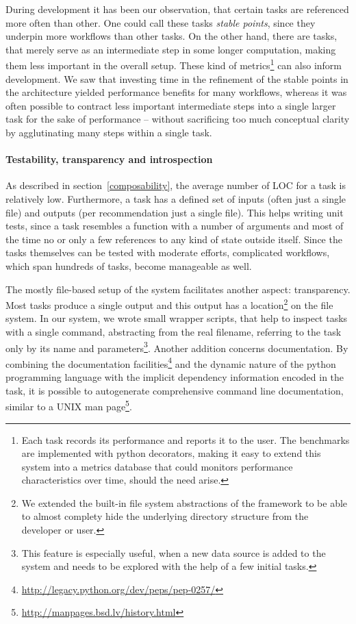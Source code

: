 \documentclass[english]{lni}
\begin{document}
During development it has been our observation, that certain tasks are referenced more often
than other. One could call these tasks \emph{stable points}, since they underpin
more workflows than other tasks. On the other hand, there are tasks, that merely
serve as an intermediate step in some longer computation, making them
less important in the overall setup. These kind of metrics\footnote{Each
task records its performance and reports it to the user. The benchmarks
are implemented with python decorators, making it easy to extend this system
into a metrics database that could monitors performance characteristics
over time, should the need arise.}
can also inform development. We saw that investing time in the refinement of the stable points in the
architecture yielded performance benefits for many workflows, whereas it was
often possible to contract less important intermediate steps into a single larger
task for the sake of performance -- without sacrificing too much conceptual
clarity by agglutinating many steps within a single task.

\paragraph{Testability, transparency and introspection}

As described in section~\ref{composability}, the average number of LOC for a
task is relatively low. Furthermore, a task has a defined set of inputs (often
just a single file) and outputs (per recommendation just a single file).
This helps writing unit tests, since a task resembles a function with
a number of arguments and most of the time no or only a few references to
any kind of state outside itself. Since the tasks themselves can be tested
with moderate efforts, complicated workflows, which span hundreds of tasks,
become manageable as well.

The mostly file-based setup of the system facilitates another aspect: transparency.
Most tasks produce a single output and this output has a location\footnote{We extended the built-in file system abstractions of the framework to be able to almost complety hide the underlying directory structure from the developer or user.} on the file system.
In our system, we wrote small wrapper scripts, that help to inspect tasks with a single command, abstracting
from the real filename, referring to the task only by its name and parameters\footnote{This feature is especially useful, when a new data source is added to the system
and needs to be explored with the help of a few initial tasks.}. Another
addition concerns documentation. By combining the documentation facilities\footnote{\url{http://legacy.python.org/dev/peps/pep-0257/}}
and the dynamic nature of the python programming language with the implicit
dependency information encoded in the task, it is possible to autogenerate
comprehensive command line documentation, similar to a UNIX man page\footnote{\url{http://manpages.bsd.lv/history.html}}.
\end{document}
